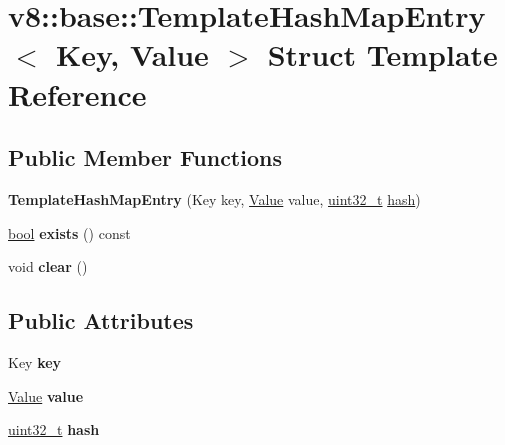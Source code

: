 \hypertarget{structv8_1_1base_1_1TemplateHashMapEntry}{}\section{v8\+:\+:base\+:\+:Template\+Hash\+Map\+Entry$<$ Key, Value $>$ Struct Template Reference}
\label{structv8_1_1base_1_1TemplateHashMapEntry}
\subsection*{Public Member Functions}
\begin{DoxyCompactItemize}
\item 
\mbox{\label{structv8_1_1base_1_1TemplateHashMapEntry_a23643b135103c80f1971ce2e6df16932}} 
{\bfseries Template\+Hash\+Map\+Entry} (Key key, \mbox{\hyperlink{classv8_1_1Value}{Value}} value, \mbox{\hyperlink{classuint32__t}{uint32\+\_\+t}} \mbox{\hyperlink{structv8_1_1base_1_1hash}{hash}})
\item 
\mbox{\label{structv8_1_1base_1_1TemplateHashMapEntry_a0a6894bd83e76f75a45f239fd3cb15b1}} 
\mbox{\hyperlink{classbool}{bool}} {\bfseries exists} () const
\item 
\mbox{\label{structv8_1_1base_1_1TemplateHashMapEntry_a04b2884650bde59656b5d7ffafd13274}} 
void {\bfseries clear} ()
\end{DoxyCompactItemize}
\subsection*{Public Attributes}
\begin{DoxyCompactItemize}
\item 
\mbox{\label{structv8_1_1base_1_1TemplateHashMapEntry_a174014ed72e03c7c784769f72d694683}} 
Key {\bfseries key}
\item 
\mbox{\label{structv8_1_1base_1_1TemplateHashMapEntry_a1a0fd5679125cfb0715e9aaba5c49f77}} 
\mbox{\hyperlink{classv8_1_1Value}{Value}} {\bfseries value}
\item 
\mbox{\label{structv8_1_1base_1_1TemplateHashMapEntry_a05b2533581bca418eb35f7fa76594692}} 
\mbox{\hyperlink{classuint32__t}{uint32\+\_\+t}} {\bfseries hash}
\end{DoxyCompactItemize}


